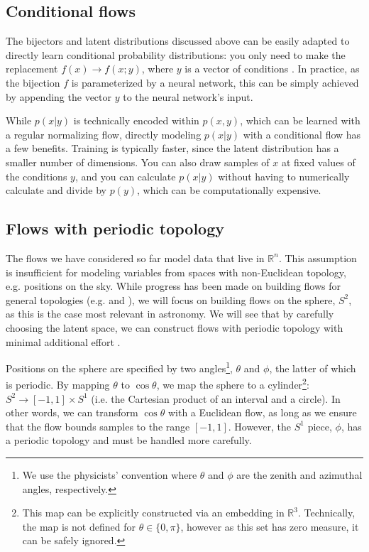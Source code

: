 \documentclass[twocolumn]{aastex631}
\newcommand{\R}{\mathbb{R}}
\begin{document}
\subsection{Conditional flows}
\label{sec:conditional}

The bijectors and latent distributions discussed above can be easily adapted to directly learn conditional probability distributions:
you only need to make the replacement $f(x) \to f(x;y)$, where $y$ is a vector of conditions \citep{winkler2019}.
In practice, as the bijection $f$ is parameterized by a neural network, this can be simply achieved by appending the vector $y$ to the neural network's input.

While $p(x|y)$ is technically encoded within $p(x,y)$, which can be learned with a regular normalizing flow, directly modeling $p(x|y)$ with a conditional flow has a few benefits.
Training is typically faster, since the latent distribution has a smaller number of dimensions.
You can also draw samples of $x$ at fixed values of the conditions $y$, and you can calculate $p(x|y)$ without having to numerically calculate and divide by $p(y)$, which can be computationally expensive.

\subsection{Flows with periodic topology}
\label{sec:periodic}

The flows we have considered so far model data that live in $\R^n$.
This assumption is insufficient for modeling variables from spaces with non-Euclidean topology, e.g. positions on the sky.
While progress has been made on building flows for general topologies (e.g. \citealt{gemici2016} and \citealt{falorsi2019}), we will focus on building flows on the sphere, $S^2$, as this is the case most relevant in astronomy.
We will see that by carefully choosing the latent space, we can construct flows with periodic topology with minimal additional effort \citep{rezende2020}.

Positions on the sphere are specified by two angles\footnote{
We use the physicists' convention where $\theta$ and $\phi$ are the zenith and azimuthal angles, respectively.
},
$\theta$ and $\phi$, the latter of which is periodic.
By mapping $\theta$ to $\cos\theta$, we map the sphere to a cylinder\footnote{
This map can be explicitly constructed via an embedding in $\R^3$.
Technically, the map is not defined for $\theta \in \{0, \pi\}$, however as this set has zero measure, it can be safely ignored.}:
$S^2 \to [-1,1] \times S^1$ (i.e. the Cartesian product of an interval and a circle).
In other words, we can transform $\cos\theta$ with a Euclidean flow, as long as we ensure that the flow bounds samples to the range $[-1, 1]$.
However, the $S^1$ piece, $\phi$, has a periodic topology and must be handled more carefully.
\end{document}
